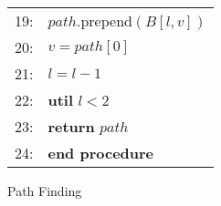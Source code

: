 \documentclass{sig-alternate-05-2015}
\begin{document}
\begin{figure}
\begin{tabular}{p{3pt}l}
19:&\hspace{20pt}     $path$.prepend$(B[l, v])$ \\
20:&\hspace{20pt}     $v = path[0]$ \\
21:&\hspace{20pt}     $l = l - 1$ \\
22:&\hspace{10pt} \textbf{util} $l < 2$ \\
23:&\hspace{10pt} \textbf{return} $path$ \\
24:&\textbf{end procedure} \\
\end{tabular}
\caption{Path Finding}
\label{fig:path}
\end{figure}
\end{document}
